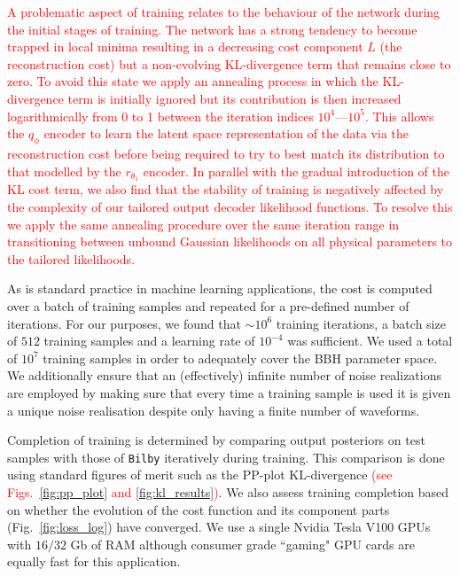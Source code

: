 \documentclass[%
showpacs,
nofootinbib,
 amsmath,amssymb,
 aps,
 twocolumn,
 prl,
 reprint,
floatfix,
]{revtex4-1}
\newcommand{\new}[1]{\textcolor{red}{#1}}
\begin{document}
%
%
\new{A problematic aspect of training relates to the behaviour of the network
during the initial stages of training. The network has a strong tendency to
become trapped in local minima resulting in a decreasing cost component $L$
(the reconstruction cost) but a non-evolving \ac{KL}-divergence term that
remains close to zero. To avoid this state we apply an annealing process in
which the \ac{KL}-divergence term is initially ignored but its contribution is
then increased logarithmically from 0 to 1 between the iteration indices
$10^4$---$10^5$. This allows the $q_{\phi}$ encoder to learn the latent space
representation of the data via the reconstruction cost before being required to
try to best match its distribution to that modelled by the $r_{\theta_1}$
encoder. In parallel with the gradual introduction of the \ac{KL} cost term, we
also find that the stability of training is negatively affected by the
complexity of our tailored output decoder likelihood functions. To resolve this
we apply the same annealing procedure over the same iteration range in transitioning
between unbound Gaussian likelihoods on all physical parameters to the tailored
likelihoods.}   

%
%
As is standard practice in machine learning applications, the cost is computed
over a batch of training samples and repeated for a pre-defined number of
iterations. For our purposes, we found that $\sim 10^6$ training
iterations, a batch size of $512$ training samples and a learning rate of
$10^{-4}$ was sufficient. We used a total of $10^7$ training samples in order
to adequately cover the \ac{BBH} parameter space. We additionally ensure that
an (effectively) infinite number of noise realizations are employed by making
sure that every time a training sample is used it is given a unique noise
realisation despite only having a finite number of waveforms.

%
%
Completion of training is determined by comparing output posteriors on test
samples with those of \texttt{Bilby} iteratively during training. This
comparison is done using standard figures of merit such as the \ac{PP}-plot
\ac{KL}-divergence \new{(see Figs.~\ref{fig:pp_plot} and
\ref{fig:kl_results})}. We also assess training completion based on whether the
evolution of the cost function and its component parts
(Fig.~\ref{fig:loss_log}) have converged. We use a single Nvidia Tesla V100
\acp{GPU} with $16/32$ Gb of RAM although consumer grade ``gaming" \ac{GPU}
cards are equally fast for this application.
\end{document}
